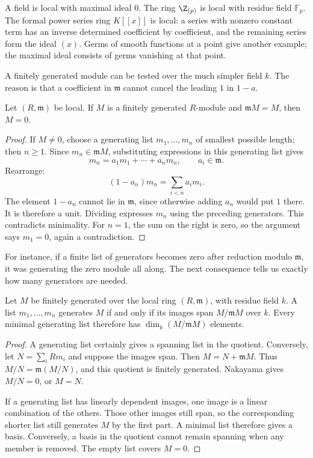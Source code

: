 A field is local with maximal ideal $0$. The ring $\Z_{(p)}$ is local with residue field $\mathbb F_p$. The formal power series ring $K[[x]]$ is local: a series with nonzero constant term has an inverse determined coefficient by coefficient, and the remaining series form the ideal $(x)$. Germs of smooth functions at a point give another example; the maximal ideal consists of germs vanishing at that point.

A finitely generated module can be tested over the much simpler field $k$. The reason is that a coefficient in $\mathfrak m$ cannot cancel the leading $1$ in $1-a$.

\begin{theorem}\label{thm:nakayama}
Let $(R,\mathfrak m)$ be local. If $M$ is a finitely generated $R$-module and $\mathfrak mM=M$, then $M=0$.
\end{theorem}

\begin{proof}
If $M\ne0$, choose a generating list $m_1,\ldots,m_n$ of smallest possible length; then $n\ge1$. Since $m_n\in\mathfrak mM$, substituting expressions in this generating list gives
\[
 m_n=a_1m_1+\cdots+a_nm_n,\qquad a_i\in\mathfrak m.
\]
Rearrange:
\[
 (1-a_n)m_n=\sum_{i<n}a_im_i.
\]
The element $1-a_n$ cannot lie in $\mathfrak m$, since otherwise adding $a_n$ would put $1$ there. It is therefore a unit. Dividing expresses $m_n$ using the preceding generators. This contradicts minimality. For $n=1$, the sum on the right is zero, so the argument says $m_1=0$, again a contradiction.
\end{proof}

For instance, if a finite list of generators becomes zero after reduction modulo $\mathfrak m$, it was generating the zero module all along. The next consequence tells us exactly how many generators are needed.

\begin{corollary}\label{cor:mingens}
Let $M$ be finitely generated over the local ring $(R,\mathfrak m)$, with residue field $k$. A list $m_1,\ldots,m_n$ generates $M$ if and only if its images span $M/\mathfrak mM$ over $k$. Every minimal generating list therefore has $\dim_k(M/\mathfrak mM)$ elements.
\end{corollary}

\begin{proof}
A generating list certainly gives a spanning list in the quotient. Conversely, let $N=\sum_iRm_i$ and suppose the images span. Then $M=N+\mathfrak mM$. Thus $M/N=\mathfrak m(M/N)$, and this quotient is finitely generated. Nakayama gives $M/N=0$, or $M=N$.

If a generating list has linearly dependent images, one image is a linear combination of the others. Those other images still span, so the corresponding shorter list still generates $M$ by the first part. A minimal list therefore gives a basis. Conversely, a basis in the quotient cannot remain spanning when any member is removed. The empty list covers $M=0$.
\end{proof}

